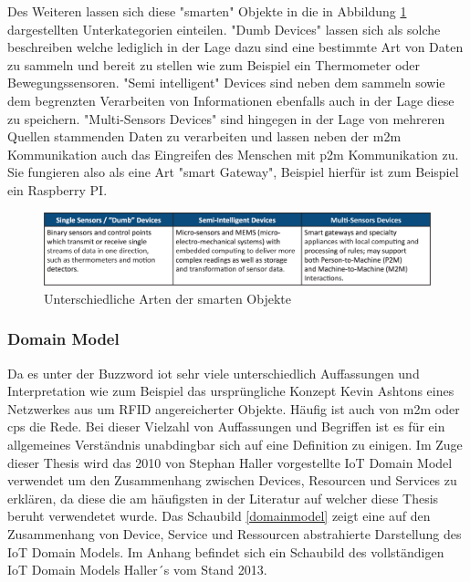 \documentclass[a4paper, 12pt, twoside, headsepline=true]{scrartcl} %
\begin{document}
Des Weiteren lassen sich diese "smarten" Objekte in die in Abbildung \ref{iotdevices} dargestellten Unterkategorien einteilen. "Dumb Devices" lassen sich als solche beschreiben welche lediglich in der Lage dazu sind eine bestimmte Art von Daten zu sammeln und bereit zu stellen wie zum Beispiel ein Thermometer oder Bewegungssensoren. "Semi intelligent" Devices sind neben dem sammeln sowie dem begrenzten Verarbeiten von Informationen ebenfalls auch in der Lage diese zu speichern. "Multi-Sensors Devices" sind hingegen in der Lage von mehreren Quellen stammenden Daten zu verarbeiten und lassen neben der \ac{m2m} Kommunikation auch das Eingreifen des Menschen mit \ac{p2m} Kommunikation zu. Sie fungieren also als eine Art "smart Gateway", Beispiel hierfür ist zum Beispiel ein Raspberry PI.

\begin{figure}[H]
	\includegraphics[height=3 cm,keepaspectratio,center]{figures/iotDevices}
	\caption{Unterschiedliche Arten der smarten Objekte \cite{iotdevices}}
	\label{iotdevices}
\end{figure}

\subsubsection{Domain Model}\label{sec:DomainModel}

Da es unter der Buzzword \ac{iot} sehr viele unterschiedlich Auffassungen und Interpretation wie zum Beispiel das ursprüngliche Konzept Kevin Ashtons eines Netzwerkes aus um RFID angereicherter Objekte. Häufig ist auch von \ac{m2m} oder \ac{cps} die Rede. Bei dieser Vielzahl von Auffassungen und Begriffen ist es für ein allgemeines Verständnis unabdingbar sich auf eine Definition zu einigen. Im Zuge dieser Thesis wird das 2010 von Stephan Haller vorgestellte IoT Domain Model verwendet um den Zusammenhang zwischen Devices, Resourcen und Services zu erklären\cite{haller2010things}, da diese die am häufigsten  in der Literatur auf welcher diese Thesis beruht verwendetet wurde. Das Schaubild \ref{domainmodel} zeigt eine auf den Zusammenhang von Device, Service und Ressourcen abstrahierte Darstellung des IoT Domain Models. Im Anhang befindet sich ein Schaubild des vollständigen IoT Domain Models Haller´s vom Stand 2013.
\end{document}

